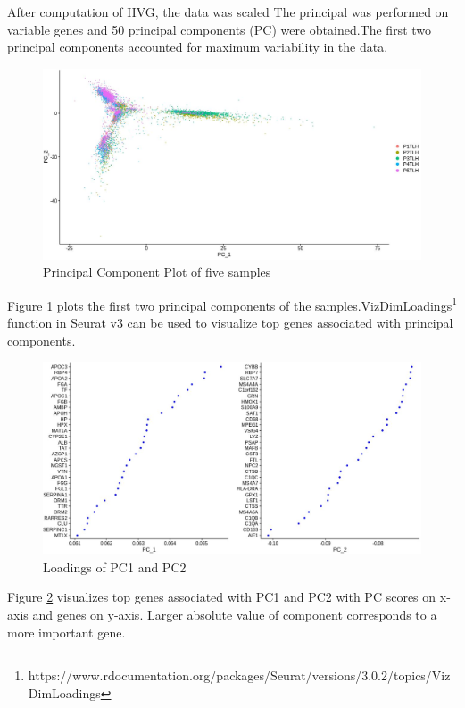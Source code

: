 \documentclass{sydneythesis}
\begin{document}
After computation of HVG, the data was scaled The principal was
performed on variable genes and 50 principal components (PC) were
obtained.The first two principal components accounted for maximum
variability in the data.

\begin{figure}[H]
  \includegraphics[scale=0.5]{pcaliver.JPG}
  \caption{Principal Component Plot of five samples}
  \label{fig:fig2}
\end{figure}

Figure \ref{fig:fig2} plots the first two principal components of the
samples.VizDimLoadings\footnote{https://www.rdocumentation.org/packages/Seurat/versions/3.0.2/topics/VizDimLoadings}
function in Seurat v3 can be used to visualize top genes associated with
principal components.

\begin{figure}[H]
  \includegraphics[scale=0.4]{pcloadliver.JPG}
  \caption{Loadings of PC1 and PC2}
  \label{fig:fig3}
\end{figure}

Figure \ref{fig:fig3} visualizes top genes associated with PC1 and PC2
with PC scores on x-axis and genes on y-axis. Larger absolute value of
component corresponds to a more important gene.
\end{document}
